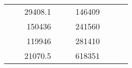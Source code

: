 \begin{table}[H]
\begin{tabular}{|ccrccrccc}
\multicolumn{1}{|c|}{\cellcolor[HTML]{FFFFC7}}                                & \multicolumn{1}{c|}{\cellcolor[HTML]{DDFDFF}}                      & \multicolumn{1}{r|}{\cellcolor[HTML]{DAE8FC}29408.1}   & \multicolumn{1}{c|}{\cellcolor[HTML]{FFFFC7}}                                & \multicolumn{1}{c|}{\cellcolor[HTML]{DDFDFF}}                       & \multicolumn{1}{r|}{\cellcolor[HTML]{DDFDFF}146409}    &                                                                              &                                                                    &                                                        \\ \cline{3-3} \cline{6-6}
\multicolumn{1}{|c|}{\cellcolor[HTML]{FFFFC7}}                                & \multicolumn{1}{c|}{\cellcolor[HTML]{DDFDFF}}                      & \multicolumn{1}{r|}{\cellcolor[HTML]{DDFDFF}150436}    & \multicolumn{1}{c|}{\cellcolor[HTML]{FFFFC7}}                                & \multicolumn{1}{c|}{\cellcolor[HTML]{DDFDFF}}                       & \multicolumn{1}{r|}{\cellcolor[HTML]{DAE8FC}241560}    &                                                                              &                                                                    &                                                        \\ \cline{3-3} \cline{6-6}
\multicolumn{1}{|c|}{\cellcolor[HTML]{FFFFC7}}                                & \multicolumn{1}{c|}{\cellcolor[HTML]{DDFDFF}}                      & \multicolumn{1}{r|}{\cellcolor[HTML]{DAE8FC}119946}    & \multicolumn{1}{c|}{\cellcolor[HTML]{FFFFC7}}                                & \multicolumn{1}{c|}{\cellcolor[HTML]{DDFDFF}}                       & \multicolumn{1}{r|}{\cellcolor[HTML]{DDFDFF}281410}    &                                                                              &                                                                    &                                                        \\ \cline{3-3} \cline{6-6}
\multicolumn{1}{|c|}{\cellcolor[HTML]{FFFFC7}}                                & \multicolumn{1}{c|}{\cellcolor[HTML]{DDFDFF}}                      & \multicolumn{1}{r|}{\cellcolor[HTML]{DDFDFF}21070.5}   & \multicolumn{1}{c|}{\cellcolor[HTML]{FFFFC7}}                                & \multicolumn{1}{c|}{\cellcolor[HTML]{DDFDFF}}                       & \multicolumn{1}{r|}{\cellcolor[HTML]{DAE8FC}618351}    &                                                                              &                                                                    &                                                        \\ \cline{3-3} \cline{6-6}

\end{tabular}
\end{table}

